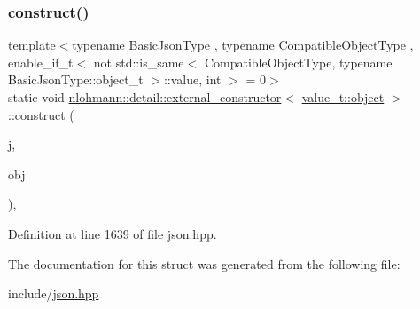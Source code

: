 \subsubsection{\texorpdfstring{construct()}{construct()}\hspace{0.1cm}{\footnotesize\ttfamily [3/3]}}
{\footnotesize\ttfamily template$<$typename Basic\+Json\+Type , typename Compatible\+Object\+Type , enable\+\_\+if\+\_\+t$<$ not std\+::is\+\_\+same$<$ Compatible\+Object\+Type, typename Basic\+Json\+Type\+::object\+\_\+t $>$\+::value, int $>$  = 0$>$ \\
static void \hyperlink{structnlohmann_1_1detail_1_1external__constructor}{nlohmann\+::detail\+::external\+\_\+constructor}$<$ \hyperlink{namespacenlohmann_1_1detail_a1ed8fc6239da25abcaf681d30ace4985aa8cfde6331bd59eb2ac96f8911c4b666}{value\+\_\+t\+::object} $>$\+::construct (\begin{DoxyParamCaption}\item[{Basic\+Json\+Type \&}]{j,  }\item[{const Compatible\+Object\+Type \&}]{obj }\end{DoxyParamCaption})\hspace{0.3cm}{\ttfamily [inline]}, {\ttfamily [static]}}



Definition at line 1639 of file json.\+hpp.



The documentation for this struct was generated from the following file\+:\begin{DoxyCompactItemize}
\item 
include/\hyperlink{json_8hpp}{json.\+hpp}\end{DoxyCompactItemize}
